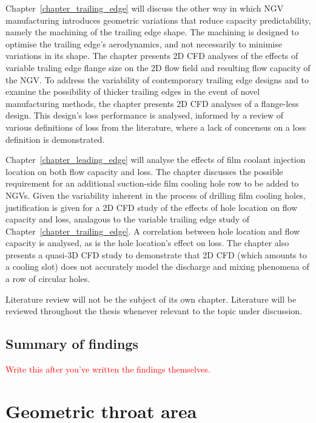 \documentclass[a4paper, 11pt, twoside]{report}
\begin{document}
Chapter~\ref{chapter_trailing_edge} will discuss the other way in which NGV manufacturing introduces geometric variations that reduce capacity predictability, namely the machining of the trailing edge shape. The machining is designed to optimise the trailing edge's aerodynamics, and not necessarily to minimise variations in its shape. The chapter presents 2D CFD analyses of the effects of variable traling edge flange size on the 2D flow field and resulting flow capacity of the NGV. To address the variability of contemporary trailing edge designs and to examine the possibility of thicker trailing edges in the event of novel manufacturing methods, the chapter presents 2D CFD analyses of a flange-less design. This design's loss performance is analysed, informed by a review of various definitions of loss from the literature, where a lack of concensus on a loss definition is demonstrated.

Chapter~\ref{chapter_leading_edge} will analyse the effects of film coolant injection location on both flow capacity and loss. The chapter discusses the possible requirement for an additional suction-side film cooling hole row to be added to NGVs. Given the variability inherent in the process of drilling film cooling holes, justification is given for a 2D CFD study of the effects of hole location on flow capacity and loss, analagous to the variable trailing edge study of Chapter~\ref{chapter_trailing_edge}. A correlation between hole location and flow capacity is analysed, as is the hole location's effect on loss. The chapter also presents a quasi-3D CFD study to demonstrate that 2D CFD (which amounts to a cooling slot) does not accurately model the discharge and mixing phenomena of a row of circular holes.

Literature review will not be the subject of its own chapter. Literature will be reviewed throughout the thesis whenever relevant to the topic under discussion.

\section{Summary of findings}

\textcolor{red}{Write this after you've written the findings themselves.}

\chapter{Geometric throat area}
\label{chapter_geometric_throat_area}
\end{document}
